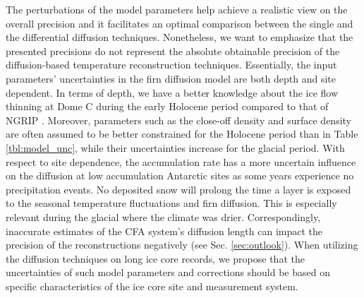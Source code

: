 \documentclass[11pt, draftcls, onecolumn]{IEEEtran} %
\numberwithin{equation}{section}
\numberwithin{table}{section}
\numberwithin{figure}{section}
\begin{document}
The perturbations of the model parameters help achieve a realistic view on the overall precision
and it facilitates an optimal comparison between the single and the differential diffusion techniques.
Nonetheless, we want to emphasize that the presented precisions do not represent the absolute obtainable precision 
of the diffusion-based temperature reconstruction techniques. 
Essentially, the input parameters' uncertainties in the firn diffusion model 
are both depth and site dependent. 
In terms of depth, we have a better knowledge about the ice flow thinning at Dome C during the early Holocene period compared
to that of NGRIP \citep{Gkinis2014}.
Moreover, parameters such as the close-off density and surface density 
are often assumed to be better constrained for the Holocene period than in Table \ref{tbl:model_unc}, 
while their uncertainties increase for the glacial period.
With respect to site dependence, the accumulation rate has a more uncertain influence on the diffusion
at low accumulation Antarctic sites as some years experience no precipitation events.
No deposited snow will prolong the time a layer is exposed to the seasonal temperature fluctuations and firn diffusion.
This is especially relevant during the glacial where the climate was drier.
Correspondingly, inaccurate estimates of the CFA system's diffusion length can 
impact the precision of the reconstructions negatively (see Sec. \ref{sec:outlook}).
When utilizing the diffusion techniques on long ice core records,
we propose that the uncertainties of such model parameters and corrections should be
based on specific characteristics of the ice core site and measurement system.




\end{document}
